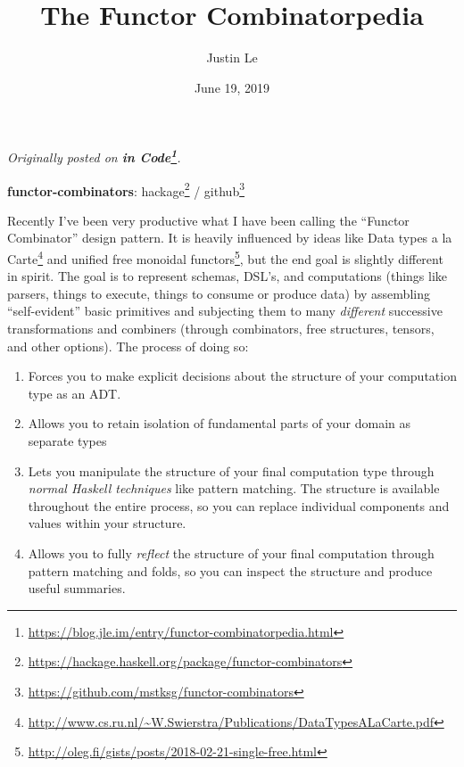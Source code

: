 \documentclass[]{article}
\title{The Functor Combinatorpedia}
\author{Justin Le}
\date{June 19, 2019}
\renewcommand{\href}[2]{#2\footnote{\url{#1}}}
\begin{document}
\maketitle

\emph{Originally posted on
\textbf{\href{https://blog.jle.im/entry/functor-combinatorpedia.html}{in
Code}}.}

\textbf{functor-combinators}:
\href{https://hackage.haskell.org/package/functor-combinators}{hackage} /
\href{https://github.com/mstksg/functor-combinators}{github}

Recently I've been very productive what I have been calling the ``Functor
Combinator'' design pattern. It is heavily influenced by ideas like
\href{http://www.cs.ru.nl/~W.Swierstra/Publications/DataTypesALaCarte.pdf}{Data
types a la Carte} and
\href{http://oleg.fi/gists/posts/2018-02-21-single-free.html}{unified free
monoidal functors}, but the end goal is slightly different in spirit. The goal
is to represent schemas, DSL's, and computations (things like parsers, things to
execute, things to consume or produce data) by assembling ``self-evident'' basic
primitives and subjecting them to many \emph{different} successive
transformations and combiners (through combinators, free structures, tensors,
and other options). The process of doing so:

\begin{enumerate}
\def\labelenumi{\arabic{enumi}.}
\tightlist
\item
  Forces you to make explicit decisions about the structure of your computation
  type as an ADT.
\item
  Allows you to retain isolation of fundamental parts of your domain as separate
  types
\item
  Lets you manipulate the structure of your final computation type through
  \emph{normal Haskell techniques} like pattern matching. The structure is
  available throughout the entire process, so you can replace individual
  components and values within your structure.
\item
  Allows you to fully \emph{reflect} the structure of your final computation
  through pattern matching and folds, so you can inspect the structure and
  produce useful summaries.
\end{enumerate}
\end{document}
